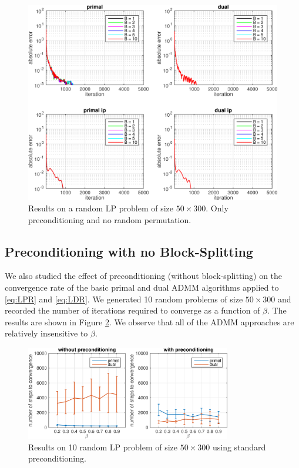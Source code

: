 \documentclass{article}
\begin{document}
\begin{figure}[h]
	\includegraphics[width=\textwidth]{../figures/precond_norndperm.png}
	\caption{Results on a random LP problem of size $50 \times 300$. Only preconditioning and no random permutation.}
	\label{fig:p_nor}
\end{figure}

\subsection*{Preconditioning with no Block-Splitting}

We also studied the effect of preconditioning (without block-splitting) on the convergence rate of the basic primal and dual ADMM algorithms applied to \eqref{eq:LPR} and \eqref{eq:LDR}. We generated 10 random problems of size $50 \times 300$ and recorded the number of iterations required to converge as a function of $\beta$. The results are shown in Figure \ref{fig:base_p_d}. We observe that all of the ADMM approaches are relatively insensitive to $\beta$.

\begin{figure}[ht]
	\centering
	\includegraphics[width=0.8\textwidth]{../figures/primal_dual_preconditioning.png}
	\caption{Results on 10 random LP problem of size $50 \times 300$ using standard preconditioning. }
	\label{fig:base_p_d}
\end{figure}
\end{document}
